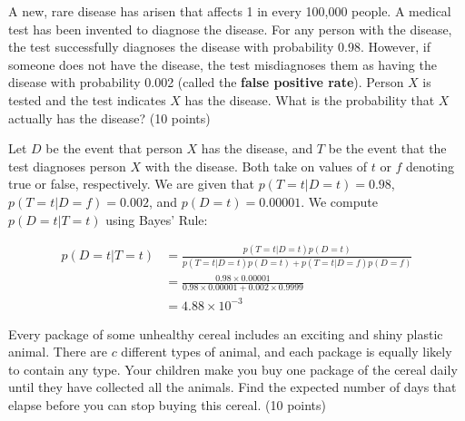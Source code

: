 \documentclass[fleqn]{homework}
\begin{document}
  \begin{problem}{4}
    \begin{question}
      A new, rare disease has arisen that affects 1 in every 100,000 people.  A
      medical test has been invented to diagnose the disease.  For any person
      with the disease, the test successfully diagnoses the disease with
      probability 0.98.  However, if someone does not have the disease, the test
      misdiagnoses them as having the disease with probability 0.002 (called the
      \textbf{false positive rate}).  Person $X$ is tested and the test
      indicates $X$ has the disease.  What is the probability that $X$ actually
      has the disease? (10 points)
    \end{question}

    Let $D$ be the event that person $X$ has the disease, and $T$ be the event
    that the test diagnoses person $X$ with the disease.  Both take on values of
    $t$ or $f$ denoting true or false, respectively.  We are given that
    $p(T=t|D=t) = 0.98$, $p(T=t|D=f)=0.002$, and $p(D=t) = 0.00001$.  We compute
    $p(D=t|T=t)$ using Bayes' Rule:

    \begin{align*}
      p(D=t|T=t) &= \frac{p(T=t|D=t)p(D=t)}{p(T=t|D=t)p(D=t) + p(T=t|D=f)p(D=f)}\\
                 &= \frac{0.98 \times 0.00001}{0.98 \times 0.00001 + 0.002 \times 0.9999}\\
                 &= 4.88 \times 10^{-3}
    \end{align*}
  \end{problem}

  \begin{problem}{5}
    \begin{question}
      Every package of some unhealthy cereal includes an exciting and shiny
      plastic animal.  There are $c$ different types of animal, and each package
      is equally likely to contain any type.  Your children make you buy one
      package of the cereal daily until they have collected all the animals.
      Find the expected number of days that elapse before you can stop buying
      this cereal. (10 points)
    \end{question}
  \end{problem}
\end{document}
